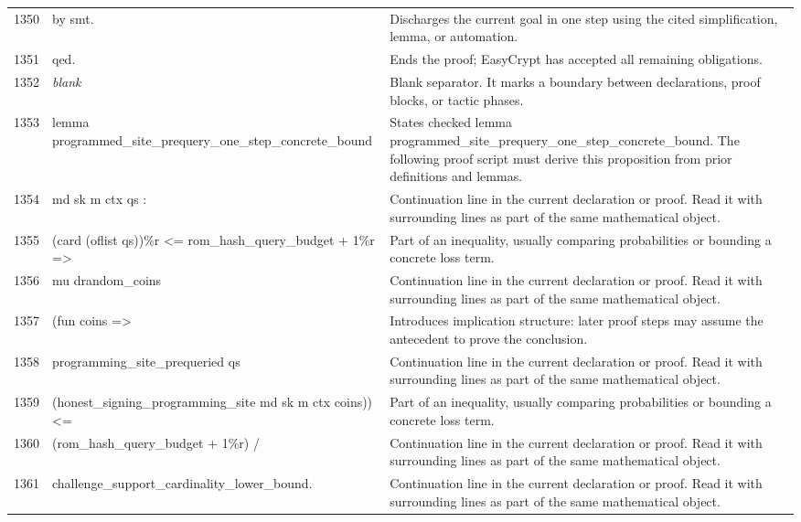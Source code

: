 \documentclass[10pt]{article}
\begin{document}
\begin{longtable}{r L{0.53\textwidth} L{0.37\textwidth}}
1350 & {\ttfamily\scriptsize by smt.} & Discharges the current goal in one step using the cited simplification, lemma, or automation. \\
1351 & {\ttfamily\scriptsize qed.} & Ends the proof; EasyCrypt has accepted all remaining obligations. \\
1352 & {\ttfamily\scriptsize \emph{blank}} & Blank separator.  It marks a boundary between declarations, proof blocks, or tactic phases. \\
1353 & {\ttfamily\scriptsize lemma programmed\_site\_prequery\_one\_step\_concrete\_bound} & States checked lemma programmed\_site\_prequery\_one\_step\_concrete\_bound.  The following proof script must derive this proposition from prior definitions and lemmas. \\
1354 & {\ttfamily\scriptsize   md sk m ctx qs :} & Continuation line in the current declaration or proof.  Read it with surrounding lines as part of the same mathematical object. \\
1355 & {\ttfamily\scriptsize   (card (oflist qs))\%r <= rom\_hash\_query\_budget + 1\%r =>} & Part of an inequality, usually comparing probabilities or bounding a concrete loss term. \\
1356 & {\ttfamily\scriptsize   mu drandom\_coins} & Continuation line in the current declaration or proof.  Read it with surrounding lines as part of the same mathematical object. \\
1357 & {\ttfamily\scriptsize     (fun coins =>} & Introduces implication structure: later proof steps may assume the antecedent to prove the conclusion. \\
1358 & {\ttfamily\scriptsize       programming\_site\_prequeried qs} & Continuation line in the current declaration or proof.  Read it with surrounding lines as part of the same mathematical object. \\
1359 & {\ttfamily\scriptsize         (honest\_signing\_programming\_site md sk m ctx coins)) <=} & Part of an inequality, usually comparing probabilities or bounding a concrete loss term. \\
1360 & {\ttfamily\scriptsize   (rom\_hash\_query\_budget + 1\%r) /} & Continuation line in the current declaration or proof.  Read it with surrounding lines as part of the same mathematical object. \\
1361 & {\ttfamily\scriptsize     challenge\_support\_cardinality\_lower\_bound.} & Continuation line in the current declaration or proof.  Read it with surrounding lines as part of the same mathematical object. \\

\end{longtable}
\end{document}
